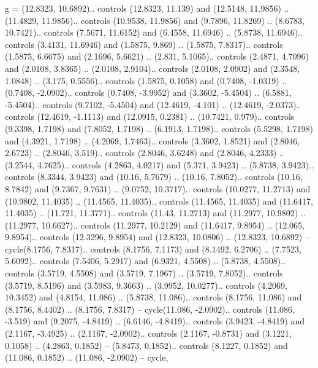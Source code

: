 g = {(12.8323, 10.6892).. controls (12.8323, 11.139) and (12.5148, 11.9856) .. (11.4829, 11.9856).. controls (10.9538, 11.9856) and (9.7896, 11.8269) .. (8.6783, 10.7421).. controls (7.5671, 11.6152) and (6.4558, 11.6946) .. (5.8738, 11.6946).. controls (3.4131, 11.6946) and (1.5875, 9.869) .. (1.5875, 7.8317).. controls (1.5875, 6.6675) and (2.1696, 5.6621) .. (2.831, 5.1065).. controls (2.4871, 4.7096) and (2.0108, 3.8365) .. (2.0108, 2.9104).. controls (2.0108, 2.0902) and (2.3548, 1.0848) .. (3.175, 0.5556).. controls (1.5875, 0.1058) and (0.7408, -1.0319) .. (0.7408, -2.0902).. controls (0.7408, -3.9952) and (3.3602, -5.4504) .. (6.5881, -5.4504).. controls (9.7102, -5.4504) and (12.4619, -4.101) .. (12.4619, -2.0373).. controls (12.4619, -1.1113) and (12.0915, 0.2381) .. (10.7421, 0.979).. controls (9.3398, 1.7198) and (7.8052, 1.7198) .. (6.1913, 1.7198).. controls (5.5298, 1.7198) and (4.3921, 1.7198) .. (4.2069, 1.7463).. controls (3.3602, 1.8521) and (2.8046, 2.6723) .. (2.8046, 3.519).. controls (2.8046, 3.6248) and (2.8046, 4.2333) .. (3.2544, 4.7625).. controls (4.2863, 4.0217) and (5.371, 3.9423) .. (5.8738, 3.9423).. controls (8.3344, 3.9423) and (10.16, 5.7679) .. (10.16, 7.8052).. controls (10.16, 8.7842) and (9.7367, 9.7631) .. (9.0752, 10.3717).. controls (10.0277, 11.2713) and (10.9802, 11.4035) .. (11.4565, 11.4035).. controls (11.4565, 11.4035) and (11.6417, 11.4035) .. (11.721, 11.3771).. controls (11.43, 11.2713) and (11.2977, 10.9802) .. (11.2977, 10.6627).. controls (11.2977, 10.2129) and (11.6417, 9.8954) .. (12.065, 9.8954).. controls (12.3296, 9.8954) and (12.8323, 10.0806) .. (12.8323, 10.6892) -- cycle(8.1756, 7.8317).. controls (8.1756, 7.1173) and (8.1492, 6.2706) .. (7.7523, 5.6092).. controls (7.5406, 5.2917) and (6.9321, 4.5508) .. (5.8738, 4.5508).. controls (3.5719, 4.5508) and (3.5719, 7.1967) .. (3.5719, 7.8052).. controls (3.5719, 8.5196) and (3.5983, 9.3663) .. (3.9952, 10.0277).. controls (4.2069, 10.3452) and (4.8154, 11.086) .. (5.8738, 11.086).. controls (8.1756, 11.086) and (8.1756, 8.4402) .. (8.1756, 7.8317) -- cycle(11.086, -2.0902).. controls (11.086, -3.519) and (9.2075, -4.8419) .. (6.6146, -4.8419).. controls (3.9423, -4.8419) and (2.1167, -3.4925) .. (2.1167, -2.0902).. controls (2.1167, -0.8731) and (3.1221, 0.1058) .. (4.2863, 0.1852) -- (5.8473, 0.1852).. controls (8.1227, 0.1852) and (11.086, 0.1852) .. (11.086, -2.0902) -- cycle},

